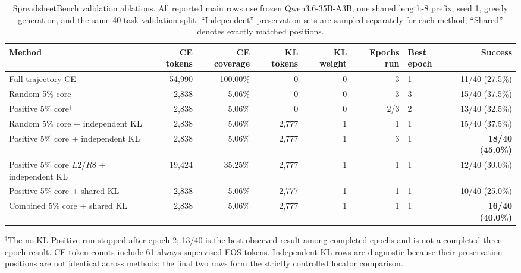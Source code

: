 \documentclass[10pt]{article}
\newcommand{\best}[1]{\textbf{#1}}
\begin{document}
\begin{table}[t]
  \centering
  \caption{SpreadsheetBench validation ablations. All reported main rows use frozen
  Qwen3.6-35B-A3B, one shared length-8 prefix, seed 1, greedy generation, and the
  same 40-task validation split. ``Independent'' preservation sets are sampled
  separately for each method; ``Shared'' denotes exactly matched positions.}
  \label{tab:validation-ablation}
  \small
  \setlength{\tabcolsep}{5pt}
  \begin{tabular}{lrrrrrlr}
    \toprule
    Method & CE tokens & CE coverage & KL tokens & KL weight & Epochs run & Best epoch & Success \\
    \midrule
    Full-trajectory CE & 54,990 & 100.00\% & 0 & 0 & 3 & 1 & 11/40 (27.5\%) \\
    Random 5\% core & 2,838 & 5.06\% & 0 & 0 & 3 & 3 & 15/40 (37.5\%) \\
    Positive 5\% core$^{\dagger}$ & 2,838 & 5.06\% & 0 & 0 & 2/3 & 2 & 13/40 (32.5\%) \\
    Random 5\% core + independent KL & 2,838 & 5.06\% & 2,777 & 1 & 1 & 1 & 15/40 (37.5\%) \\
    Positive 5\% core + independent KL & 2,838 & 5.06\% & 2,777 & 1 & 3 & 1 & \best{18/40 (45.0\%)} \\
    Positive 5\% core $L2/R8$ + independent KL & 19,424 & 35.25\% & 2,777 & 1 & 1 & 1 & 12/40 (30.0\%) \\
    \midrule
    Positive 5\% core + shared KL & 2,838 & 5.06\% & 2,777 & 1 & 1 & 1 & 10/40 (25.0\%) \\
    Combined 5\% core + shared KL & 2,838 & 5.06\% & 2,777 & 1 & 1 & 1 & \best{16/40 (40.0\%)} \\
    \bottomrule
  \end{tabular}

  \vspace{2pt}
  \parbox{0.96\linewidth}{\footnotesize
  $^{\dagger}$The no-KL Positive run stopped after epoch 2; 13/40 is the best
  observed result among completed epochs and is not a completed three-epoch result.
  CE-token counts include 61 always-supervised EOS tokens. Independent-KL rows are
  diagnostic because their preservation positions are not identical across methods;
  the final two rows form the strictly controlled locator comparison.}
\end{table}
\end{document}
